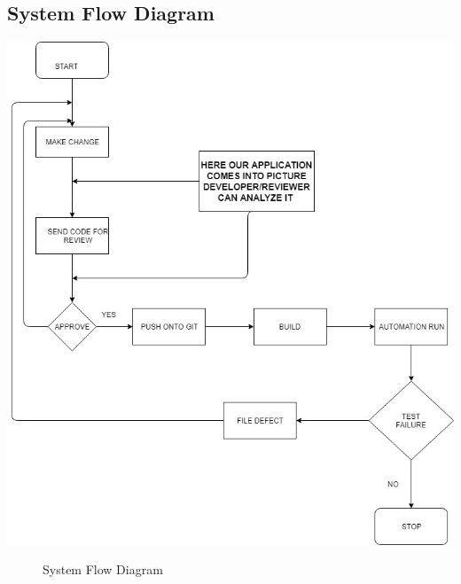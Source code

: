 \documentclass[oneside,a4paper,12pt]{book}
\begin{document}
\subsection{System Flow Diagram}
\vspace*{1\baselineskip}
\includegraphics[width=\textwidth]{flow.png}
\begin{figure}[h]
    \caption{System Flow Diagram}
    \label{fig:System Flow Diagram}
\end{figure}
\end{document}
